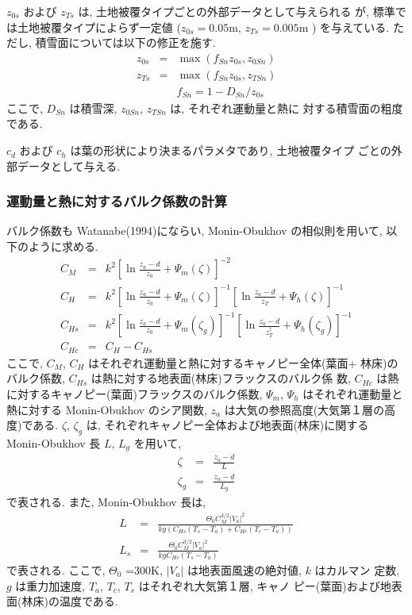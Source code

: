 $z_{0s}$ および $z_{Ts}$ は, 土地被覆タイプごとの外部データとして与えられる
が, 標準では土地被覆タイプによらず一定値 ($z_{0s}=0.05$m,
$z_{Ts}=0.005$m ) を与えている. 
ただし, 積雪面については以下の修正を施す. 
\begin{eqnarray}
 z_{0s} &=& \max( f_{Sn} z_{0s}, z_{0Sn} ) \\
 z_{Ts} &=& \max( f_{Sn} z_{0s}, z_{TSn} ) \\
        &&  f_{Sn} = 1 - D_{Sn} / z_{0s}
\end{eqnarray}
ここで, $D_{Sn}$ は積雪深, $z_{0Sn}$, $z_{TSn}$ は, それぞれ運動量と熱に
対する積雪面の粗度である. 

$c_d$ および $c_h$ は葉の形状により決まるパラメタであり, 土地被覆タイプ
ごとの外部データとして与える. 

\subsubsection{運動量と熱に対するバルク係数の計算}

バルク係数も Watanabe(1994)にならい, Monin-Obukhov の相似則を用いて, 以
下のように求める. 
\begin{eqnarray}
 C_M &=& k^2 \left[ \ln \frac{z_a-d}{z_0} + \Psi_m(\zeta) \right]^{-2} \\
 C_H &=& k^2 \left[ \ln \frac{z_a-d}{z_0} + \Psi_m(\zeta) \right]^{-1}
             \left[ \ln \frac{z_a-d}{z_T} + \Psi_h(\zeta) \right]^{-1} \\
 C_{Hs} &=& k^2 \left[ \ln \frac{z_a-d}{z_0} + \Psi_m(\zeta_g) \right]^{-1}
             \left[ \ln \frac{z_a-d}{z_T^{\dagger}} + \Psi_h(\zeta_g) \right]^{-1} \\
 C_{Hc} &=& C_H - C_{Hs}
\end{eqnarray}
ここで, $C_M$, $C_H$ はそれぞれ運動量と熱に対するキャノピー全体(葉面$+$
林床)のバルク係数, $C_{Hs}$ は熱に対する地表面(林床)フラックスのバルク係
数, $C_{Hc}$ は熱に対するキャノピー(葉面)フラックスのバルク係数, 
$\Psi_m$, $\Psi_h$ はそれぞれ運動量と熱に対する Monin-Obukhov のシア関数,
$z_a$ は大気の参照高度(大気第１層の高度)である. 
$\zeta$, $\zeta_g$ は, それぞれキャノピー全体および地表面(林床)に関する
Monin-Obukhov 長 $L$, $L_g$ を用いて, 
\begin{eqnarray}
 \zeta &=& \frac{z_a - d}{L} \\
 \zeta_g &=& \frac{z_a - d}{L_g}
\end{eqnarray}
で表される. 
また, Monin-Obukhov 長は, 
\begin{eqnarray}
 L &=& \frac{\Theta_0 C_M^{3/2}|V_a|^2}{kg(C_{Hs}(T_s - T_a) + C_{Hc}(T_c - T_a))} \\
 L_s &=& \frac{\Theta_0 C_M^{3/2}|V_a|^2}{kg C_{Hs}(T_s - T_a)}
\end{eqnarray}
で表される. 
ここで, $\Theta_0$ =300K, $|V_a|$ は地表面風速の絶対値, $k$ はカルマン
定数, $g$ は重力加速度, $T_a$, $T_c$, $T_s$ はそれぞれ大気第１層, キャノ
ピー(葉面)および地表面(林床)の温度である. 

